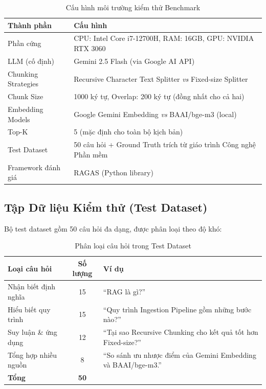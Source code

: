 \begin{table}[H]
  \centering
  \caption{Cấu hình môi trường kiểm thử Benchmark}
  \label{tab:bench-env}
  \renewcommand{\arraystretch}{1.4}
  \begin{tabularx}{\textwidth}{|l|X|}
    \hline
    \rowcolor{blue!10}
    \textbf{Thành phần} & \textbf{Cấu hình} \\
    \hline
    Phần cứng & CPU: Intel Core i7-12700H, RAM: 16GB, GPU: NVIDIA RTX 3060 \\
    \hline
    LLM (cố định) & Gemini 2.5 Flash (via Google AI API) \\
    \hline
    Chunking Strategies & Recursive Character Text Splitter \textit{vs} Fixed-size Splitter \\
    \hline
    Chunk Size & 1000 ký tự, Overlap: 200 ký tự (đồng nhất cho cả hai) \\
    \hline
    Embedding Models & Google Gemini Embedding \textit{vs} BAAI/bge-m3 (local) \\
    \hline
    Top-K & 5 (mặc định cho toàn bộ kịch bản) \\
    \hline
    Test Dataset & 50 câu hỏi + Ground Truth trích từ giáo trình Công nghệ Phần mềm \\
    \hline
    Framework đánh giá & RAGAS (Python library) \\
    \hline
  \end{tabularx}
\end{table}

\subsection{Tập Dữ liệu Kiểm thử (Test Dataset)}

Bộ test dataset gồm 50 câu hỏi đa dạng, được phân loại theo độ khó:

\begin{table}[H]
  \centering
  \caption{Phân loại câu hỏi trong Test Dataset}
  \label{tab:dataset}
  \renewcommand{\arraystretch}{1.4}
  \begin{tabularx}{\textwidth}{|l|c|X|}
    \hline
    \rowcolor{blue!10}
    \textbf{Loại câu hỏi} & \textbf{Số lượng} & \textbf{Ví dụ} \\
    \hline
    Nhận biết định nghĩa & 15 & ``RAG là gì?'' \\
    \hline
    Hiểu biết quy trình & 15 & ``Quy trình Ingestion Pipeline gồm những bước nào?'' \\
    \hline
    Suy luận \& ứng dụng & 12 & ``Tại sao Recursive Chunking cho kết quả tốt hơn Fixed-size?'' \\
    \hline
    Tổng hợp nhiều nguồn & 8 & ``So sánh ưu nhược điểm của Gemini Embedding và BAAI/bge-m3.'' \\
    \hline
    \textbf{Tổng} & \textbf{50} & \\
    \hline
  \end{tabularx}
\end{table}

